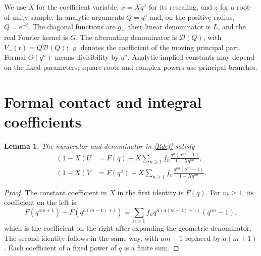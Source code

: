 \documentclass[11pt]{amsart}
\newtheorem{lemma}[theorem]{Lemma}
\theoremstyle{definition}
\theoremstyle{remark}
\numberwithin{equation}{section}
\begin{document}
We use $X$ for the coefficient variable, $x=Xq^a$ for its rescaling, and $z$ for a root-of-unity sample. In analytic arguments $Q=q^a$ and, on the positive radius, $Q=e^{-t}$. The diagonal functions are $g_r$, their linear denominator is $L$, and the real Fourier kernel is $G$. The alternating denominator is $\mathcal D(Q)$, with $V_-(t)=Q\mathcal D(Q)$; $\varrho$ denotes the coefficient of the moving principal part. Formal $O(q^n)$ means divisibility by $q^n$. Analytic implied constants may depend on the fixed parameters; square roots and complex powers use principal branches.

\section{Formal contact and integral coefficients}
\begin{lemma}\label{lambert}
The numerator and denominator in \eqref{Rdef} satisfy
\begin{align}
 (1-X)U&=F(q)+X\sum_{n\ge1}f_n
 \frac{q^n(q^{an}-1)}{1-Xq^{an}},\label{LamU}\\
 (1-X)V&=F(q^a)+X\sum_{n\ge1}f_n
 \frac{q^{an}(q^{an}-1)}{1-Xq^{an}}.\label{LamV}
\end{align}
\end{lemma}
\begin{proof}
The constant coefficient in $X$ in the first identity is $F(q)$. For $m\ge1$, its coefficient on the left is
\[
 F(q^{am+1})-F(q^{a(m-1)+1})
 =\sum_{n\ge1}f_nq^{n(a(m-1)+1)}(q^{an}-1),
\]
which is the coefficient on the right after expanding the geometric denominator. The second identity follows in the same way, with $am+1$ replaced by $a(m+1)$. Each coefficient of a fixed power of $q$ is a finite sum.
\end{proof}
\end{document}
